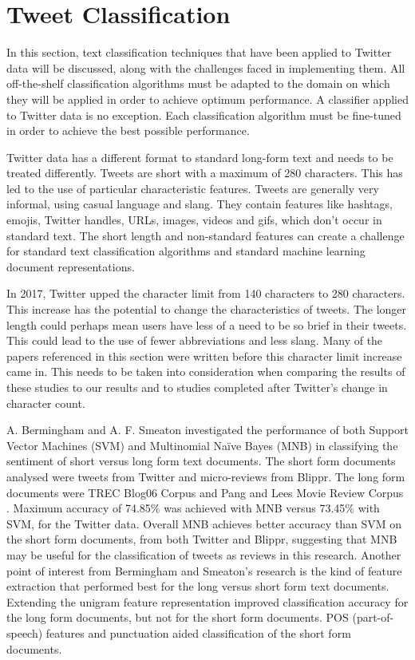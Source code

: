 \section{Tweet Classification}

In this section, text classification techniques that have been applied to Twitter data will be discussed, along with the challenges faced in implementing them. All off-the-shelf classification algorithms must be adapted to the domain on which they will be applied in order to achieve optimum performance. A classifier applied to Twitter data is no exception. Each classification algorithm must be fine-tuned in order to achieve the best possible performance. 

Twitter data has a different format to standard long-form text and needs to be treated differently. Tweets are short with a maximum of 280 characters. This has led to the use of particular characteristic features. Tweets are generally very informal, using casual language and slang. They contain features like hashtags, emojis, Twitter handles, URLs, images, videos and gifs, which don't occur in standard text. The short length and non-standard features can create a challenge for standard text classification algorithms and standard machine learning document representations. 

In 2017, Twitter upped the character limit from 140 characters to 280 characters. This increase has the potential to change the characteristics of tweets. The longer length could perhaps mean users have less of a need to be so brief in their tweets. This could lead to the use of fewer abbreviations and less slang. Many of the papers referenced in this section were written before this character limit increase came in. This needs to be taken into consideration when comparing the results of these studies to our results and to studies completed after Twitter's change in character count.

A. Bermingham and A. F. Smeaton \cite{Berm2010} investigated the performance of both Support Vector Machines (SVM) and Multinomial Naïve Bayes (MNB) in classifying the sentiment of short versus long form text documents. The short form documents analysed were tweets from Twitter and micro-reviews from Blippr. The long form documents were TREC Blog06 Corpus and Pang and Lees Movie Review Corpus \cite{panglee2004}. Maximum accuracy of 74.85\% was achieved with MNB versus 73.45\% with SVM, for the Twitter data. Overall MNB achieves better accuracy than SVM on the short form documents, from both Twitter and Blippr, suggesting that MNB may be useful for the classification of tweets as reviews in this research. Another point of interest from Bermingham and Smeaton's research is the kind of feature extraction that performed best for the long versus short form text documents. Extending the unigram feature representation improved classification accuracy for the long form documents, but not for the short form documents. POS (part-of-speech) features and punctuation aided classification of the short form documents.


